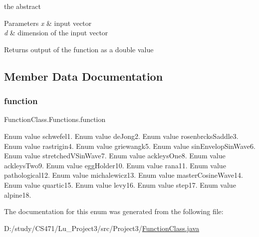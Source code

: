 the abstract 
\begin{DoxyParams}{Parameters}
{\em x} & input vector \\
\hline
{\em d} & dimension of the input vector \\
\hline
\end{DoxyParams}
\begin{DoxyReturn}{Returns}
output of the function as a double value 
\end{DoxyReturn}


\subsection{Member Data Documentation}
\mbox{\label{enum_function_class_1_1_functions_a4c02e6f15bcb371868f67221aa3fd7bd}} 
\subsubsection{\texorpdfstring{function}{function}}
{\footnotesize\ttfamily Function\+Class.\+Functions.\+function}

Enum value schwefel1. Enum value de\+Jong2. Enum value rosenbrcks\+Saddle3. Enum value rastrigin4. Enum value griewangk5. Enum value sin\+Envelop\+Sin\+Wave6. Enum value stretched\+V\+Sin\+Wave7. Enum value ackleys\+One8. Enum value ackleys\+Two9. Enum value egg\+Holder10. Enum value rana11. Enum value pathological12. Enum value michalewicz13. Enum value master\+Cosine\+Wave14. Enum value quartic15. Enum value levy16. Enum value step17. Enum value alpine18. 

The documentation for this enum was generated from the following file\+:\begin{DoxyCompactItemize}
\item 
D\+:/study/\+C\+S471/\+Lu\+\_\+\+Project3/src/\+Project3/\mbox{\hyperlink{_function_class_8java}{Function\+Class.\+java}}\end{DoxyCompactItemize}
